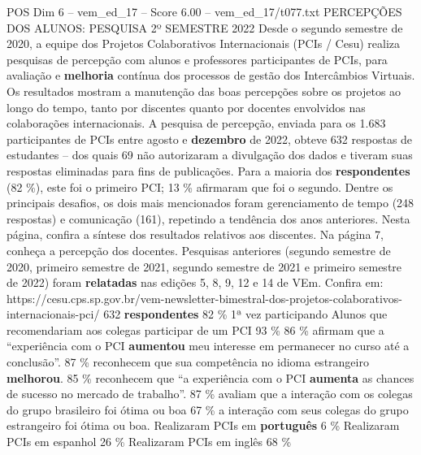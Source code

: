 \begin{textsample}{POS Dim 6 – vem\_ed\_17 – Score 6.00 – vem\_ed\_17/t077.txt}  \label{ex:f6_pos_038}
PERCEPÇÕES DOS ALUNOS: PESQUISA 2º SEMESTRE 2022 Desde o segundo semestre de 2020, a equipe dos Projetos Colaborativos Internacionais (PCIs / Cesu) realiza pesquisas de percepção com alunos e professores participantes de PCIs, para avaliação e \textbf{melhoria} contínua dos processos de gestão dos Intercâmbios Virtuais.
Os resultados mostram a manutenção das boas percepções sobre os projetos ao longo do tempo, tanto por discentes quanto por docentes envolvidos nas colaborações internacionais.
A pesquisa de percepção, enviada para os 1.683 participantes de PCIs entre agosto e \textbf{dezembro} de 2022, obteve 632 respostas de estudantes – dos quais 69 não autorizaram a divulgação dos dados e tiveram suas respostas eliminadas para fins de publicações.
Para a maioria dos \textbf{respondentes} (82 \%), este foi o primeiro PCI; 13 \% afirmaram que foi o segundo.
Dentre os principais desafios, os dois mais mencionados foram gerenciamento de tempo (248 respostas) e comunicação (161), repetindo a tendência dos anos anteriores.
Nesta página, confira a síntese dos resultados relativos aos discentes.
Na página 7, conheça a percepção dos docentes.
Pesquisas anteriores (segundo semestre de 2020, primeiro semestre de 2021, segundo semestre de 2021 e primeiro semestre de 2022) foram \textbf{relatadas} nas edições 5, 8, 9, 12 e 14 de VEm.
Confira em: https://cesu.cps.sp.gov.br/vem-newsletter-bimestral-dos-projetos-colaborativos-internacionais-pci/ 632 \textbf{respondentes} 82 \% 1ª vez participando Alunos que recomendariam aos colegas participar de um PCI 93 \% 86 \% afirmam que a “experiência com o PCI \textbf{aumentou} meu interesse em permanecer no curso até a conclusão”. 87 \% reconhecem que sua competência no idioma estrangeiro \textbf{melhorou}. 85 \% reconhecem que “a experiência com o PCI \textbf{aumenta} as chances de sucesso no mercado de trabalho”. 87 \% avaliam que a interação com os colegas do grupo brasileiro foi ótima ou boa 67 \% a interação com seus colegas do grupo estrangeiro foi ótima ou boa.
Realizaram PCIs em \textbf{português} 6 \% Realizaram PCIs em espanhol 26 \% Realizaram PCIs em inglês 68 \%

\end{textsample}
